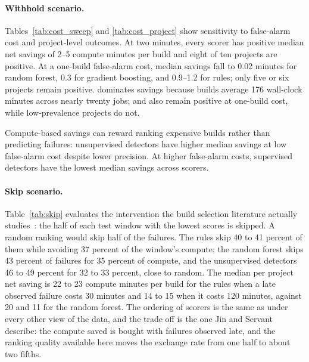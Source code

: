 \documentclass[sigconf,review,anonymous,nonacm]{acmart}
\newcommand{\proj}[1]{\path{#1}}
\begin{document}
\paragraph{Withhold scenario.} Tables~\ref{tab:cost_sweep} and \ref{tab:cost_project} show sensitivity to false-alarm cost and project-level outcomes. At two minutes, every scorer has positive median net savings of 2--5 compute minutes per build and eight of ten projects are positive. At a one-build false-alarm cost, median savings fall to 0.02 minutes for random forest, 0.3 for gradient boosting, and 0.9--1.2 for rules; only five or six projects remain positive. \proj{jruby/jruby} dominates savings because builds average 176 wall-clock minutes across nearly twenty jobs; \proj{rails/rails} and \proj{opf/openproject} also remain positive at one-build cost, while low-prevalence projects do not.

Compute-based savings can reward ranking expensive builds rather than predicting failures: unsupervised detectors have higher median savings at low false-alarm cost despite lower precision. At higher false-alarm costs, supervised detectors have the lowest median savings across scorers.





\paragraph{Skip scenario.} Table~\ref{tab:skip} evaluates the intervention the build selection literature actually studies~\cite{jin2020, jin2022, abdalkareem2021skip}: the half of each test window with the lowest scores is skipped. A random ranking would skip half of the failures. The rules skip 40 to 41 percent of them while avoiding 37 percent of the window's compute; the random forest skips 43 percent of failures for 35 percent of compute, and the unsupervised detectors 46 to 49 percent for 32 to 33 percent, close to random. The median per project net saving is 22 to 23 compute minutes per build for the rules when a late observed failure costs 30 minutes and 14 to 15 when it costs 120 minutes, against 20 and 11 for the random forest. The ordering of scorers is the same as under every other view of the data, and the trade off is the one Jin and Servant describe: the compute saved is bought with failures observed late, and the ranking quality available here moves the exchange rate from one half to about two fifths.


\end{document}
